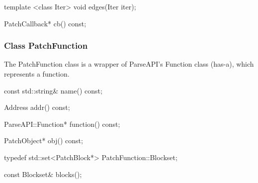 \begin{apient}
template <class Iter>
void edges(Iter iter);
\end{apient}



\begin{apient}
PatchCallback* cb() const;
\end{apient}



\subsubsection{Class PatchFunction}
\label{sec:patchfunction}


The PatchFunction class is a wrapper of ParseAPI's Function class (has-a), which
represents a function.

\begin{apient}
const std::string& name() const;
\end{apient}



\begin{apient}
Address addr() const;
\end{apient}



\begin{apient}
ParseAPI::Function* function() const;
\end{apient}




\begin{apient}
PatchObject* obj() const;
\end{apient}


\begin{apient}
typedef std::set<PatchBlock*> PatchFunction::Blockset;

const Blockset& blocks();
\end{apient}


